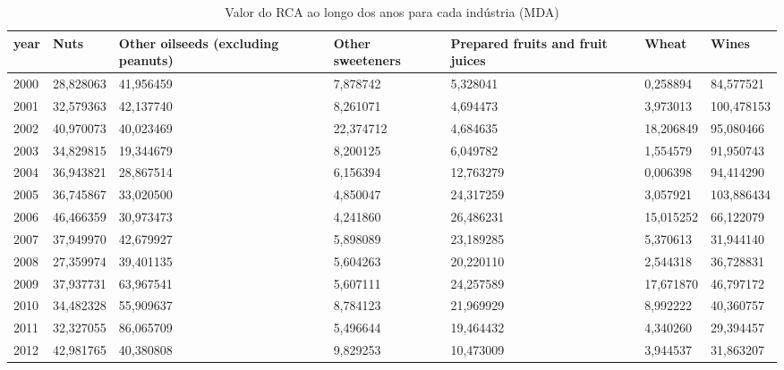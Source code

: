 \begin{table}
\centering
\caption{Valor do RCA ao longo dos anos para cada indústria (MDA)}
\begin{tabular}{p{1cm}p{2cm}p{2cm}p{2cm}p{2cm}p{2cm}p{2cm}}
\toprule
 year &      Nuts &  Other oilseeds (excluding peanuts) &  Other sweeteners &  Prepared fruits and fruit juices &     Wheat &      Wines \\
\midrule
 2000 & 28,828063 &                           41,956459 &          7,878742 &                          5,328041 &  0,258894 &  84,577521 \\
 2001 & 32,579363 &                           42,137740 &          8,261071 &                          4,694473 &  3,973013 & 100,478153 \\
 2002 & 40,970073 &                           40,023469 &         22,374712 &                          4,684635 & 18,206849 &  95,080466 \\
 2003 & 34,829815 &                           19,344679 &          8,200125 &                          6,049782 &  1,554579 &  91,950743 \\
 2004 & 36,943821 &                           28,867514 &          6,156394 &                         12,763279 &  0,006398 &  94,414290 \\
 2005 & 36,745867 &                           33,020500 &          4,850047 &                         24,317259 &  3,057921 & 103,886434 \\
 2006 & 46,466359 &                           30,973473 &          4,241860 &                         26,486231 & 15,015252 &  66,122079 \\
 2007 & 37,949970 &                           42,679927 &          5,898089 &                         23,189285 &  5,370613 &  31,944140 \\
 2008 & 27,359974 &                           39,401135 &          5,604263 &                         20,220110 &  2,544318 &  36,728831 \\
 2009 & 37,937731 &                           63,967541 &          5,607111 &                         24,257589 & 17,671870 &  46,797172 \\
 2010 & 34,482328 &                           55,909637 &          8,784123 &                         21,969929 &  8,992222 &  40,360757 \\
 2011 & 32,327055 &                           86,065709 &          5,496644 &                         19,464432 &  4,340260 &  29,394457 \\
 2012 & 42,981765 &                           40,380808 &          9,829253 &                         10,473009 &  3,944537 &  31,863207 \\

\end{tabular}
\end{table}
